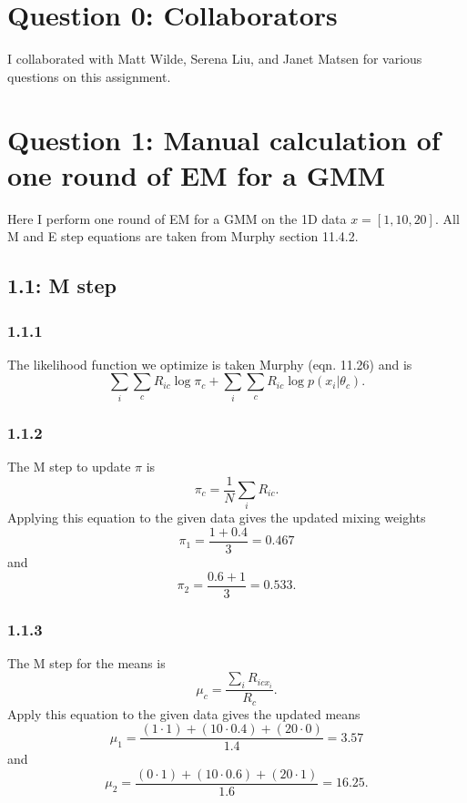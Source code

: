 \documentclass[12pt]{amsart}
\begin{document}
\section*{Question 0: Collaborators}
I collaborated with Matt Wilde, Serena Liu, and Janet Matsen for various questions on this assignment.

\section*{Question 1: Manual calculation of one round of EM for a GMM}
Here I perform one round of EM for a GMM on the 1D data $x = [1,10,20]$.  All M and E step equations are taken from Murphy section 11.4.2.

\subsection*{1.1: M step}
\subsubsection*{1.1.1}
The likelihood function we optimize is taken Murphy (eqn. 11.26) and is
\begin{equation}
\sum_i \sum_c R_{ic} \log \pi_c + \sum_i \sum_c R_{ic} \log p(x_i | \theta_c).
\end{equation}
\subsubsection*{1.1.2}
The M step to update $\pi$ is 
\begin{equation}
\pi_c = \frac{1}{N} \sum_i R_{ic}.
\end{equation}
Applying this equation to the given data gives the updated mixing weights
\begin{equation}
\pi_1 = \frac{1 + 0.4}{3} = 0.467
\end{equation}
and 
\begin{equation}
\pi_2 = \frac{0.6 + 1}{3} = 0.533.
\end{equation}

\subsubsection*{1.1.3}
The M step for the means is
\begin{equation}
\mu_c = \frac{\sum_i R_{ic x_i}}{R_c}.
\end{equation}
Apply this equation to the given data gives the updated means
\begin{equation}
\mu_1 = \frac{(1 \cdot 1) + (10 \cdot 0.4) + (20 \cdot 0)}{1.4} = 3.57
\end{equation}
and
\begin{equation}
\mu_2 = \frac{(0 \cdot 1) + (10 \cdot 0.6) + (20 \cdot 1)}{1.6} = 16.25.
\end{equation}
\end{document}
